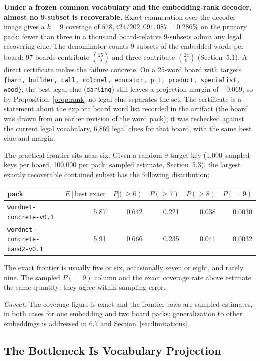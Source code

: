 \documentclass[11pt]{article}
\begin{document}
\textbf{Under a frozen common vocabulary and the embedding-rank decoder, almost no
9-subset is recoverable.} Exact enumeration over the decoder image gives a
$k = 9$ coverage of $578{,}424 / 202{,}091{,}087 = 0.286\%$ on the primary pack:
fewer than three in a thousand board-relative 9-subsets admit any legal
recovering clue. The denominator counts 9-subsets of the embedded words per
board: 97 boards contribute $\binom{25}{9}$ and three contribute $\binom{24}{9}$
(Section~5.1). A direct certificate makes the failure concrete. On a 25-word
board with targets \texttt{\{barn, builder, call, colonel, educator, pit,
product, specialist, wood\}}, the best legal clue (\texttt{darling}) still leaves
a projection margin of $-0.069$, so by Proposition~\ref{prop:rank} no legal clue
separates the set. The certificate is a statement about the explicit board word
list recorded in the artifact (the board was drawn from an earlier revision of
the word pack); it was rechecked against the current legal vocabulary, 6,869
legal clues for that board, with the same best clue and margin.

The practical frontier sits near six. Given a random 9-target key (1,000 sampled
keys per board, 100,000 per pack; sampled estimate, Section~5.3), the largest
exactly recoverable contained subset has the following distribution:

\begin{center}
\begin{tabular}{lrrrrr}
\toprule
pack & $E[\text{best exact count}]$ & $P(\ge 6)$ & $P(\ge 7)$ & $P(\ge 8)$ & $P(=9)$ \\
\midrule
\texttt{wordnet-concrete-v0.1}       & 5.87 & 0.642 & 0.221 & 0.038 & 0.0030 \\
\texttt{wordnet-concrete-band2-v0.1} & 5.91 & 0.666 & 0.235 & 0.041 & 0.0032 \\
\bottomrule
\end{tabular}
\end{center}

The exact frontier is usually five or six, occasionally seven or eight, and rarely
nine. The sampled $P(=9)$ column and the exact coverage rate above estimate the
same quantity; they agree within sampling error.

\emph{Caveat.} The coverage figure is exact and the frontier rows are sampled
estimates, in both cases for one embedding and two board packs; generalization to
other embeddings is addressed in 6.7 and Section~\ref{sec:limitations}.

\subsection{The Bottleneck Is Vocabulary Projection}
\end{document}
